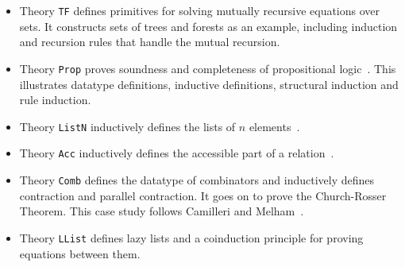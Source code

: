 \begin{itemize}
\item Theory \texttt{TF} defines primitives for solving mutually
  recursive equations over sets.  It constructs sets of trees and forests
  as an example, including induction and recursion rules that handle the
  mutual recursion.

\item Theory \texttt{Prop} proves soundness and completeness of
  propositional logic~\cite{paulson-set-II}.  This illustrates datatype
  definitions, inductive definitions, structural induction and rule
  induction.

\item Theory \texttt{ListN} inductively defines the lists of $n$
  elements~\cite{paulin-tlca}.

\item Theory \texttt{Acc} inductively defines the accessible part of a
  relation~\cite{paulin-tlca}.

\item Theory \texttt{Comb} defines the datatype of combinators and
  inductively defines contraction and parallel contraction.  It goes on to
  prove the Church-Rosser Theorem.  This case study follows Camilleri and
  Melham~\cite{camilleri92}.

\item Theory \texttt{LList} defines lazy lists and a coinduction
  principle for proving equations between them.
\end{itemize}


